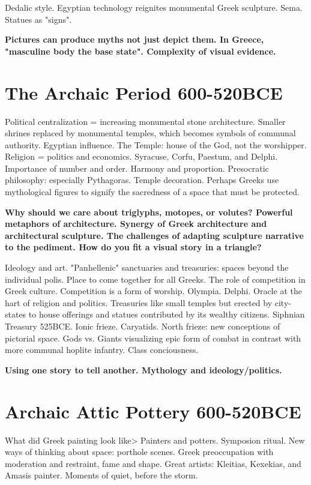 \documentclass[10pt]{armath}
\begin{document}
\begin{multicols}{2}
Dedalic style. Egyptian technology reignites monumental Greek sculpture. Sema.
Statues as "signs".

\textbf{Pictures can produce myths not just depict them. In Greece, "masculine
body the base state". Complexity of visual evidence.} 

\section{The Archaic Period 600-520BCE}%
\label{sec:the_archaic_period_600_520bce}

Political centralization = increasing monumental stone architecture. Smaller
shrines replaced by monumental temples, which becomes symbols of communal
authority. Egyptian influence. The Temple: house of the God, not the
worshipper. Religion = politics and economics. Syracuse, Corfu, Paestum, and
Delphi. Importance of number and order. Harmony and proportion. Presocratic
philosophy: especially Pythagoras. Temple decoration. Perhaps Greeks use
mythological figures to signify the sacredness of a space that must be
protected.

\textbf{Why should we care about triglyphs, motopes, or volutes? Powerful
metaphors of architecture. Synergy of Greek architecture and architectural
sculpture. The challenges of adapting sculpture narrative to the pediment. How
do you fit a visual story in a triangle?} 

Ideology and art. "Panhellenic" sanctuaries and treasuries: spaces beyond the
individual polis. Place to come together for all Greeks. The role of
competition in Greek culture. Competition is a form of worship. Olympia.
Delphi. Oracle at the hart of religion and politics. Treasuries like small
temples but erected by city-states to house offerings and statues contributed
by its wealthy citizens. Siphnian Treasury 525BCE. Ionic frieze. Caryatids.
North frieze: new conceptions of pictorial space. Gods vs. Giants visualizing
epic form of combat in contrast with more communal hoplite infantry. Class
conciousness.

\textbf{Using one story to tell another. Mythology and ideology/politics.} 

\section{Archaic Attic Pottery 600-520BCE}%
\label{sec:archaic_attic_pottery_600_520bce}

What did Greek painting look like> Painters and potters. Symposion ritual. New
ways of thinking about space: porthole scenes. Greek preoccupation with
moderation and restraint, fame and shape. Great artists: Kleitias, Kexekias,
and Amasis painter. Moments of quiet, before the storm.


\end{multicols}
\end{document}
